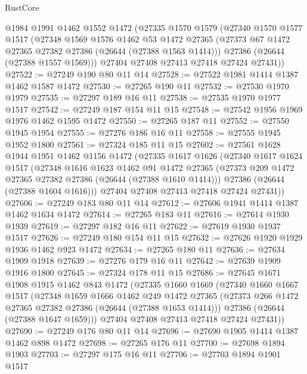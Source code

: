 \begin{lexlean}{RustCore}
\begin{coremodule}
    @1984
    @1991
    @1462
    @1552
    @1472
    (@27335
      @1570
      @1579
      (@27340
        @1570
        @1577
        @1517
        (@27348
          @1569
          @1576
          @1462
          @53
          @1472
          @27365
          (@27373 @67 @1472 @27365 @27382 @27386 (@26644 (@27388 @1563 @1414)))
          @27386
          (@26644 (@27388 @1557 @1569)))
        @27404
        @27408
        @27413
        @27418
        @27424
        @27431))
@27522 := @27249 @190 @80 @11 @14
@27528 := @27522 @1981 @1414 @1387 @1462 @1587 @1472
@27530 := @27265 @190 @11
@27532 := @27530 @1970 @1979
@27535 := @27297 @189 @16 @11
@27538 := @27535 @1970 @1977 @1517
@27542 := @27249 @187 @154 @11 @15
@27548 := @27542 @1956 @1969 @1976 @1462 @1595 @1472
@27550 := @27265 @187 @11
@27552 := @27550 @1945 @1954
@27555 := @27276 @186 @16 @11
@27558 := @27555 @1945 @1952 @1800
@27561 := @27324 @185 @11 @15
@27602 := @27561
    @1628
    @1944
    @1951
    @1462
    @1156
    @1472
    (@27335
      @1617
      @1626
      (@27340
        @1617
        @1624
        @1517
        (@27348
          @1616
          @1623
          @1462
          @91
          @1472
          @27365
          (@27373 @209 @1472 @27365 @27382 @27386 (@26644 (@27388 @1610 @1414)))
          @27386
          (@26644 (@27388 @1604 @1616)))
        @27404
        @27408
        @27413
        @27418
        @27424
        @27431))
@27606 := @27249 @183 @80 @11 @14
@27612 := @27606 @1941 @1414 @1387 @1462 @1634 @1472
@27614 := @27265 @183 @11
@27616 := @27614 @1930 @1939
@27619 := @27297 @182 @16 @11
@27622 := @27619 @1930 @1937 @1517
@27626 := @27249 @180 @154 @11 @15
@27632 := @27626 @1920 @1929 @1936 @1462 @923 @1472
@27634 := @27265 @180 @11
@27636 := @27634 @1909 @1918
@27639 := @27276 @179 @16 @11
@27642 := @27639 @1909 @1916 @1800
@27645 := @27324 @178 @11 @15
@27686 := @27645
    @1671
    @1908
    @1915
    @1462
    @843
    @1472
    (@27335
      @1660
      @1669
      (@27340
        @1660
        @1667
        @1517
        (@27348
          @1659
          @1666
          @1462
          @249
          @1472
          @27365
          (@27373 @266 @1472 @27365 @27382 @27386 (@26644 (@27388 @1653 @1414)))
          @27386
          (@26644 (@27388 @1647 @1659)))
        @27404
        @27408
        @27413
        @27418
        @27424
        @27431))
@27690 := @27249 @176 @80 @11 @14
@27696 := @27690 @1905 @1414 @1387 @1462 @898 @1472
@27698 := @27265 @176 @11
@27700 := @27698 @1894 @1903
@27703 := @27297 @175 @16 @11
@27706 := @27703 @1894 @1901 @1517

\end{coremodule}
\end{lexlean}
